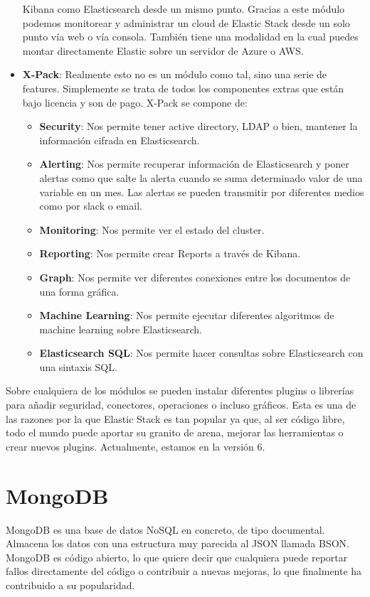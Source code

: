 \begin{itemize}
  Kibana como Elasticsearch desde un mismo punto. Gracias a este módulo
  podemos monitorear y administrar un cloud de Elastic Stack desde un solo
  punto vía web o vía consola. También tiene una modalidad en la cual
  puedes montar directamente Elastic sobre un servidor de Azure o AWS.
\item \textbf{X-Pack}: Realmente esto no es un módulo como tal, sino una
  serie de features. Simplemente se trata de todos los componentes extras
  que están bajo licencia y son de pago. X-Pack se compone de:
\begin{itemize}
\item \textbf{Security}: Nos permite tener active directory, LDAP o bien,
  mantener la información cifrada en Elasticsearch.
\item \textbf{Alerting}: Nos permite recuperar información de Elasticsearch
  y poner alertas como que salte la alerta cuando se suma determinado valor
  de una variable en un mes. Las alertas se pueden transmitir por
  diferentes medios como por slack o email.
\item \textbf{Monitoring}: Nos permite ver el estado del cluster.
\item \textbf{Reporting}: Nos permite crear Reports a través de Kibana.
\item \textbf{Graph}: Nos permite ver diferentes conexiones entre los
  documentos de una forma gráfica.
\item \textbf{Machine Learning}: Nos permite ejecutar diferentes algoritmos
  de machine learning sobre Elasticsearch.
\item\textbf{ Elasticsearch SQL}: Nos permite hacer consultas sobre
  Elasticsearch con una sintaxis SQL.
\end{itemize}
\end{itemize}

Sobre cualquiera de los módulos se pueden instalar diferentes plugins o
librerías para añadir seguridad, conectores, operaciones o incluso
gráficos. Esta es una de las razones por la que Elastic Stack es tan
popular ya que, al ser código libre, todo el mundo puede aportar su granito
de arena, mejorar las herramientas o crear nuevos plugins. Actualmente,
estamos en la versión 6.

\section{MongoDB\label{MongoDB}}

MongoDB es una base de datos NoSQL en concreto, de tipo documental.
Almacena los datos con una estructura muy parecida al JSON llamada BSON.
MongoDB es código abierto, lo que quiere decir que cualquiera puede
reportar fallos directamente del código o contribuir a nuevas mejoras, lo
que finalmente ha contribuido a su popularidad.


